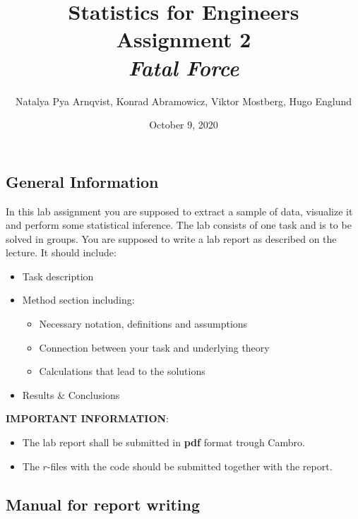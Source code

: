 \documentclass[a4paper, 10pt,serif]{article}
\title{Statistics for Engineers \\ \textbf{Assignment 2}\\ \textit{Fatal Force}}
\author{Natalya Pya Arnqvist, Konrad Abramowicz, Viktor Mostberg, Hugo Englund}
\date{October 9, 2020}
\begin{document}
\maketitle

\subsection*{General Information}
In this lab assignment you are supposed to extract a sample of data, visualize it and perform some statistical inference.
The lab consists of one task and is to be solved in groups. You are supposed to write a lab report as described on the lecture. It should include:
\begin{itemize}
\item Task description
\item Method section including:
\begin{itemize}
\item Necessary notation, definitions and assumptions
\item Connection between your task and underlying theory
\item Calculations that lead to the solutions
\end{itemize}
\item Results \& Conclusions
\end{itemize}

\textbf{IMPORTANT INFORMATION}:
\begin{itemize}
\item The lab report shall be submitted in \textbf{pdf} format trough Cambro. 
\item The $r$-files with the code should be submitted together with the report. 
\end{itemize}


\subsection*{Manual for report writing}
\end{document}
